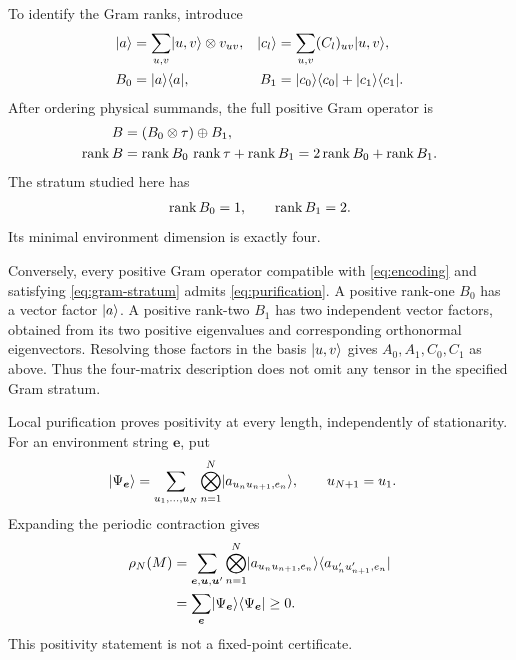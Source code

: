 To identify the Gram ranks, introduce
\begin{align}
	\lvert a\rangle    & =\sum_{u,v}\lvert u,v\rangle\otimes v_{uv},
	          &
	\lvert c_l\rangle & =\sum_{u,v}(C_l)_{uv}\lvert u,v\rangle,
	\nonumber                                           \\
	B_0       & =\lvert a\rangle\langle a\rvert,
	          &
	B_1       & =\lvert c_0\rangle\langle c_0\rvert+\lvert c_1\rangle\langle c_1\rvert.
	\label{eq:sector-grams}
\end{align}
After ordering physical summands, the full positive Gram operator is
\begin{align}
	B & =(B_0\otimes\tau)\oplus B_1,
	\nonumber                           \\
	\operatorname{rank} B
	  & =\operatorname{rank} B_0\,\operatorname{rank}\tau+\operatorname{rank} B_1
	=2\operatorname{rank} B_0+\operatorname{rank} B_1.
	\label{eq:gram-rank}
\end{align}
The stratum studied here has
\begin{align}
	\operatorname{rank} B_0=1,\qquad \operatorname{rank} B_1=2.
	\label{eq:gram-stratum}
\end{align}
Its minimal environment dimension is exactly four.

Conversely, every positive Gram operator compatible with
\cref{eq:encoding} and satisfying \cref{eq:gram-stratum} admits
\cref{eq:purification}. A positive rank-one $B_0$ has a vector factor
$\lvert a\rangle$. A positive rank-two $B_1$ has two independent vector factors,
obtained from its two positive eigenvalues and corresponding
orthonormal eigenvectors. Resolving those factors in the basis
$\lvert u,v\rangle$ gives $A_0,A_1,C_0,C_1$ as above. Thus the four-matrix
description does not omit any tensor in the specified Gram stratum.

Local purification proves positivity at every length, independently
of stationarity. For an environment string $\boldsymbol e$, put
\begin{align}
	\lvert\Psi_{\boldsymbol e}\rangle
	 & =\sum_{u_1,\ldots,u_N}
	\bigotimes_{n=1}^N\lvert a_{u_nu_{n+1},e_n}\rangle,
	\qquad u_{N+1}=u_1.
\end{align}
Expanding the periodic contraction gives
\begin{align}
	\rho_N(M)
	 & =\sum_{\boldsymbol e,\boldsymbol u,\boldsymbol u'}
	\bigotimes_{n=1}^N
	\lvert a_{u_nu_{n+1},e_n}\rangle
	\langle a_{u'_nu'_{n+1},e_n}\rvert
	\nonumber                                             \\
	 & =\sum_{\boldsymbol e}
	\lvert\Psi_{\boldsymbol e}\rangle\langle\Psi_{\boldsymbol e}\rvert
	\geq0.
	\label{eq:positivity}
\end{align}
This positivity statement is not a fixed-point certificate.


